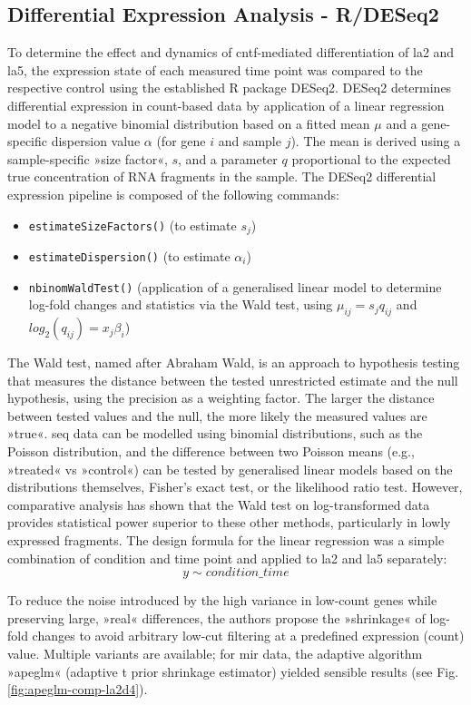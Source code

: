 \subsection{Differential Expression Analysis - R/DESeq2} \label{sec:cellculture:deseq}
To determine the effect and dynamics of \ac{cntf}-mediated differentiation of \ac{la2} and \ac{la5}, the expression state of each measured time point was compared to the respective control using the established R package DESeq2\cite{Love2014}. DESeq2 determines differential expression in count-based data by application of a linear regression model to a negative binomial distribution based on a fitted mean $\mu$ and a gene-specific dispersion value $\alpha$ (for gene $i$ and sample $j$). The mean is derived using a sample-specific »size factor«, $s$, and a parameter $q$ proportional to the expected true concentration of RNA fragments in the sample. The DESeq2 differential expression pipeline is composed of the following commands:
\begin{itemize}
\item \texttt{estimateSizeFactors()} (to estimate $s_j$)
\item \texttt{estimateDispersion()} (to estimate $\alpha_i$)
\item \texttt{nbinomWaldTest()} (application of a generalised linear model to determine log-fold changes and statistics via the Wald test, using $\mu_{ij} = s_jq_{ij}$ and $log_2(q_{ij}) = x_j\beta_i$)
\end{itemize}
The Wald test, named after Abraham Wald, is an approach to hypothesis testing that measures the distance between the tested unrestricted estimate and the null hypothesis, using the precision as a weighting factor. The larger the distance between tested values and the null, the more likely the measured values are »true«. \ac{seq} data can be modelled using binomial distributions\cite{Bullard2010}, such as the Poisson distribution, and the difference between two Poisson means (e.g., »treated« vs »control«) can be tested by generalised linear models based on the distributions themselves, Fisher's exact test, or the likelihood ratio test. However, comparative analysis has shown that the Wald test on log-transformed data provides statistical power superior to these other methods\cite{Chen2011}, particularly in lowly expressed fragments. The design formula for the linear regression was a simple combination of condition and time point and applied to \ac{la2} and \ac{la5} separately: $$y \sim condition\_time$$

To reduce the noise introduced by the high variance in low-count genes while preserving large, »real« differences, the authors propose the »shrinkage« of log-fold changes to avoid arbitrary low-cut filtering at a predefined expression (count) value. Multiple variants are available; for \ac{mir} data, the adaptive algorithm »apeglm«\cite{Zhu2019} (adaptive t prior shrinkage estimator) yielded sensible results (see Fig. \ref{fig:apeglm-comp-la2d4}).


